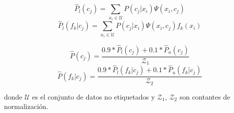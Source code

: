 \begin{equation*}
\hat{P}_l(c_j) = \sum_{x_i \in \mathcal{U}} P(c_j|x_i) \Psi(x_i, c_j)
\end{equation*}
\begin{equation*}
\hat{P}_l(f_k|c_j) = \sum_{x_i \in \mathcal{U}} P(c_j|x_i) \Psi(x_i, c_j) f_k(x_i)
\end{equation*}

\begin{equation}
\hat{P}(c_j) = \frac{0.9 * \hat{P}_l(c_j) + 0.1 * \hat{P}_u(c_j)}{\mathcal{Z}_1}
\end{equation}
\begin{equation}
\hat{P}(f_k|c_j) = \frac{0.9 * \hat{P}_l(f_k|c_j) + 0.1 * \hat{P}_u(f_k|c_j)}{\mathcal{Z}_2}
\end{equation}

donde $\mathcal{U}$ es el conjunto de datos no etiquetados y $\mathcal{Z}_1$, $\mathcal{Z}_2$ son contantes de normalización.

